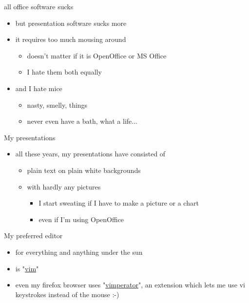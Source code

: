 \documentclass{beamer}
\begin{document}
\begin{frame}{all office software sucks}

\begin{itemize}
\item
but presentation software sucks more
\item
it requires too much mousing around
\begin{itemize}
\item
doesn't matter if it is OpenOffice or MS Office
\item
I hate them both equally
\end{itemize}
\item
and I hate mice
\begin{itemize}
\pause
\item
nasty, smelly, things
\pause
\item
never even have a bath, what a life...
\end{itemize}
\end{itemize}



\end{frame}

\begin{frame}{My presentations}

\begin{itemize}
\item
all these years, my presentations have consisted of
\begin{itemize}
\item
plain text on plain white backgrounds
\item
with hardly any pictures
\begin{itemize}
\pause
\item
I start sweating if I have to make a picture or a chart
\pause
\item
even if I'm using OpenOffice
\end{itemize}
\end{itemize}
\end{itemize}



\end{frame}

\begin{frame}{My preferred editor}

\begin{itemize}
\item
for everything and anything under the sun
\pause
\item
is "\href{http://www.vim.org}{vim}"
\pause
\item
even my firefox browser uses
"\href{http://vimperator.mozdev.org/}{vimperator}", an extension which lets me
use vi keystrokes instead of the mouse :-)
\end{itemize}



\end{frame}
\end{document}
